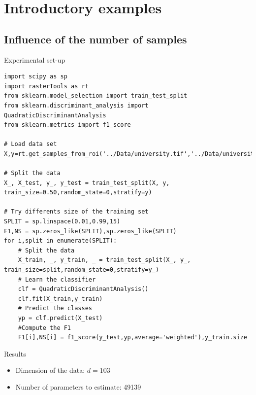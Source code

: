 \documentclass[10pt,aspectratio=1610]{beamer}
\begin{document}
\section{Introductory examples}
\label{sec:orga6ebf69}
\subsection{Influence of the number of samples}
\label{sec:org8bc32ed}
\begin{frame}[fragile,label={sec:org9e45da8}]{Experimental set-up}
 \begin{verbatim}
import scipy as sp
import rasterTools as rt
from sklearn.model_selection import train_test_split
from sklearn.discriminant_analysis import QuadraticDiscriminantAnalysis
from sklearn.metrics import f1_score

# Load data set
X,y=rt.get_samples_from_roi('../Data/university.tif','../Data/university_gt.tif')

# Split the data
X_, X_test, y_, y_test = train_test_split(X, y, train_size=0.50,random_state=0,stratify=y)

# Try differents size of the training set
SPLIT = sp.linspace(0.01,0.99,15)
F1,NS = sp.zeros_like(SPLIT),sp.zeros_like(SPLIT)
for i,split in enumerate(SPLIT):
    # Split the data
    X_train, _, y_train, _ = train_test_split(X_, y_, train_size=split,random_state=0,stratify=y_)
    # Learn the classifier
    clf = QuadraticDiscriminantAnalysis()
    clf.fit(X_train,y_train)
    # Predict the classes
    yp = clf.predict(X_test)
    #Compute the F1
    F1[i],NS[i] = f1_score(y_test,yp,average='weighted'),y_train.size
\end{verbatim}
\end{frame}

\begin{frame}[label={sec:org6194439}]{Results}
\begin{center}
\end{center}

\begin{itemize}
\item Dimension of the data: \(d=103\)
\item Number of parameters to estimate: 49139
\end{itemize}
\end{frame}
\end{document}
